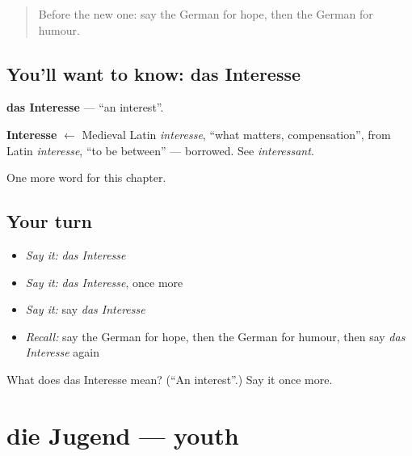 \label{lesson:GE-C231-interesse}



\begin{quote}
Before the new one: say the German for hope, then the German for humour.
\end{quote}

\subsection*{You'll want to know: das Interesse}
\textbf{das Interesse} — \textquotedblleft{}an interest\textquotedblright{}.

\begin{cousinweb}
\textbf{Interesse} $\leftarrow$ Medieval Latin \emph{interesse}, \textquotedblleft{}what matters, compensation\textquotedblright{}, from Latin \emph{interesse}, \textquotedblleft{}to be between\textquotedblright{} — borrowed. See \emph{interessant}.
\end{cousinweb}

\begin{grammarlens}[title={What you've built}]
One more word for this chapter.
\end{grammarlens}

\subsection*{Your turn}
\begin{itemize}
\raggedright
  \item \emph{Say it:} \emph{das Interesse}
  \item \emph{Say it:} \emph{das Interesse}, once more
  \item \emph{Say it:} say \emph{das Interesse}
  \item \emph{Recall:} say the German for hope, then the German for humour, then say \emph{das Interesse} again
\end{itemize}

\begin{tcolorbox}[breakable,colback=teal!4,colframe=teal!35!black,title={Before you move on}]
What does das Interesse mean? (\textquotedblleft{}An interest\textquotedblright{}.) Say it once more.
\end{tcolorbox}
\section[die Jugend]{die Jugend — youth}

\label{lesson:GE-C231-jugend}



